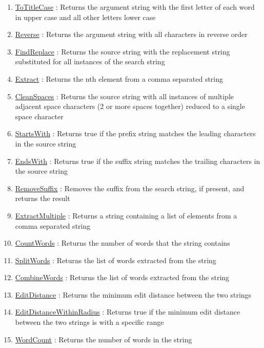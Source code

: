 \begin{enumerate}
\item \hyperlink{ecldoc:str.totitlecase}{ToTitleCase}
: Returns the argument string with the first letter of each word in upper case and all other letters lower case
\item \hyperlink{ecldoc:str.reverse}{Reverse}
: Returns the argument string with all characters in reverse order
\item \hyperlink{ecldoc:str.findreplace}{FindReplace}
: Returns the source string with the replacement string substituted for all instances of the search string
\item \hyperlink{ecldoc:str.extract}{Extract}
: Returns the nth element from a comma separated string
\item \hyperlink{ecldoc:str.cleanspaces}{CleanSpaces}
: Returns the source string with all instances of multiple adjacent space characters (2 or more spaces together) reduced to a single space character
\item \hyperlink{ecldoc:str.startswith}{StartsWith}
: Returns true if the prefix string matches the leading characters in the source string
\item \hyperlink{ecldoc:str.endswith}{EndsWith}
: Returns true if the suffix string matches the trailing characters in the source string
\item \hyperlink{ecldoc:str.removesuffix}{RemoveSuffix}
: Removes the suffix from the search string, if present, and returns the result
\item \hyperlink{ecldoc:str.extractmultiple}{ExtractMultiple}
: Returns a string containing a list of elements from a comma separated string
\item \hyperlink{ecldoc:str.countwords}{CountWords}
: Returns the number of words that the string contains
\item \hyperlink{ecldoc:str.splitwords}{SplitWords}
: Returns the list of words extracted from the string
\item \hyperlink{ecldoc:str.combinewords}{CombineWords}
: Returns the list of words extracted from the string
\item \hyperlink{ecldoc:str.editdistance}{EditDistance}
: Returns the minimum edit distance between the two strings
\item \hyperlink{ecldoc:str.editdistancewithinradius}{EditDistanceWithinRadius}
: Returns true if the minimum edit distance between the two strings is with a specific range
\item \hyperlink{ecldoc:str.wordcount}{WordCount}
: Returns the number of words in the string

\end{enumerate}
